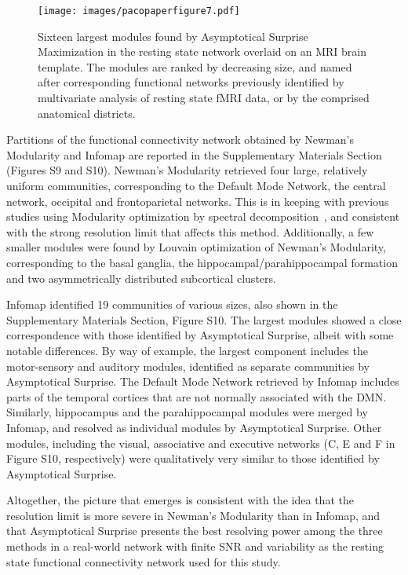 \begin{figure}[htb!]
\texttt{[image: images/pacopaperfigure7.pdf]}
\caption{Sixteen largest modules found by Asymptotical Surprise Maximization in the resting state network overlaid on an MRI brain template. The modules are ranked by decreasing size, and named after corresponding functional networks previously identified by multivariate analysis of resting state fMRI data, or by the comprised anatomical districts.}
\label{fig:cervellini4x4}
\end{figure}

Partitions of the functional connectivity network obtained by Newman's Modularity and Infomap are reported in the Supplementary Materials Section (Figures S9 and S10).
Newman's Modularity retrieved four large, relatively uniform communities, corresponding to the Default Mode Network, the central network, occipital and frontoparietal networks.
This is in keeping with previous studies using  Modularity optimization by spectral decomposition~\cite{crossley2013a}, and consistent with the strong resolution limit that affects this method.
Additionally, a few smaller modules were found by Louvain optimization of Newman's Modularity, corresponding to the basal ganglia, the hippocampal/parahippocampal formation and two asymmetrically distributed subcortical clusters.

Infomap identified 19 communities of various sizes, also shown in the Supplementary Materials Section, Figure S10.
The largest modules showed a close correspondence with those identified by Asymptotical Surprise, albeit with some notable differences.
By way of example, the largest component includes the motor-sensory and auditory modules, identified as separate communities by Asymptotical Surprise.
The Default Mode Network retrieved by Infomap includes parts of the temporal cortices that are not normally associated with the DMN.
Similarly, hippocampus and the parahippocampal modules were merged by Infomap, and resolved as individual modules  by Asymptotical Surprise.
Other modules, including the visual, associative and executive networks (C, E and F in Figure S10, respectively) were qualitatively very similar to those identified by Asymptotical Surprise.

Altogether, the picture that emerges is consistent with the idea that the resolution limit is more severe in Newman's Modularity than in Infomap, and that Asymptotical Surprise presents the best resolving power among the three methods in a real-world network with finite SNR and variability as the resting state functional connectivity network used for this study.

